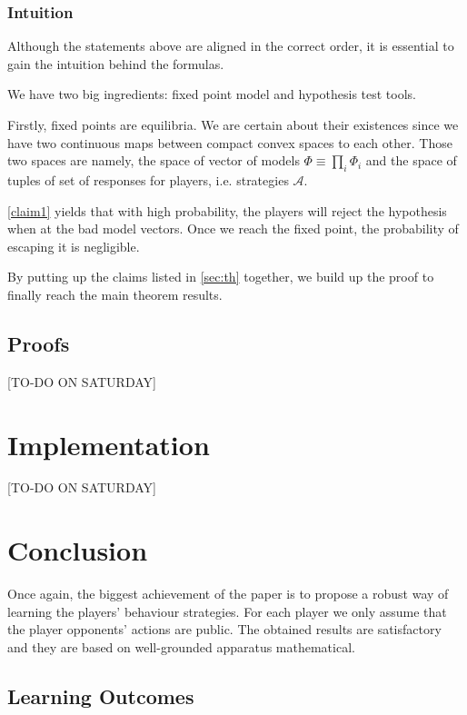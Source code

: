 \documentclass[]{spie}  %
\begin{document}
\subsubsection{Intuition}
Although the statements above are aligned in the correct order, it is essential to gain the intuition behind the formulas.

We have two big ingredients: fixed point model and hypothesis test tools.

Firstly, fixed points are equilibria. We are certain about their existences since we have two continuous maps between compact convex spaces to each other. Those two spaces are namely, the space of vector of models $\Phi \equiv \prod_i \Phi_i$ and the space of tuples of set of responses for players, i.e. strategies $\mathcal{A}$.

\autoref{claim1} yields that with high probability, the players will reject the hypothesis when at the bad model vectors. Once we reach the fixed point, the probability of escaping it is negligible. 

By putting up the claims listed in \autoref{sec:th} together, we build up the proof to finally reach the main theorem results.


\subsection{Proofs}
\label{sec:proofs}



[TO-DO ON SATURDAY]


\section{Implementation}
\label{sec:impl}
[TO-DO ON SATURDAY]


\section{Conclusion}

Once again, the biggest achievement of the paper is to propose a robust way of learning the players' behaviour strategies. For each player we only assume that the player opponents' actions are public. The obtained results are satisfactory and they are based on well-grounded apparatus mathematical.

\subsection{Learning Outcomes}
\label{sec:conclusion1}
\end{document}
